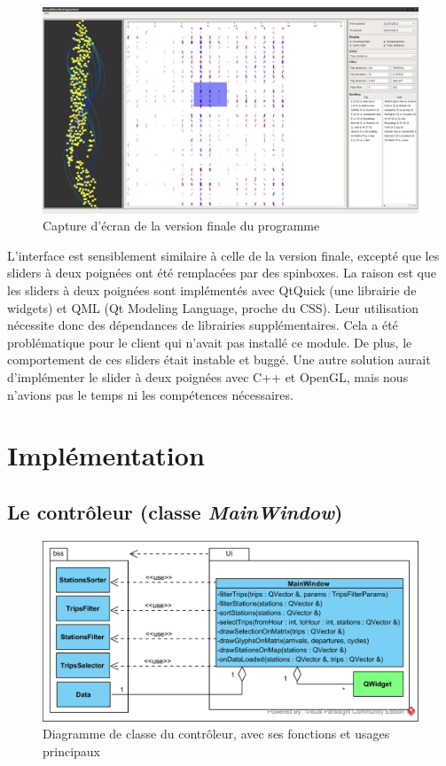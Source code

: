 \documentclass[12pt]{article}
\begin{document}
		\begin{figure}[!h]
		\begin{center}
		\includegraphics[scale=.25]{screen_final_2.png}
		\caption{Capture d’écran de la version finale du programme}
		\end{center}
		\end{figure}
		
		L’interface est sensiblement similaire à celle de la version finale, excepté que les sliders à deux poignées ont été remplacées par des spinboxes. La raison est que les sliders à deux poignées sont implémentés avec QtQuick (une librairie de widgets) et QML (Qt Modeling Language, proche du CSS). Leur utilisation nécessite donc des dépendances de librairies supplémentaires. Cela a été problématique pour le client qui n’avait pas installé ce module. De plus, le comportement de ces sliders était instable et buggé. Une autre solution aurait d'implémenter le slider à deux poignées avec C++ et OpenGL, mais nous n’avions pas le temps ni les compétences nécessaires.
		

	\section{Implémentation}
		\subsection{Le contrôleur (classe \textit{MainWindow})}
		\begin{figure}[!h]
		\begin{center}
		\includegraphics[scale=1]{class_diagram_controleur.png}
		\caption{Diagramme de classe du contrôleur, avec ses fonctions et usages principaux}
		\label{fig:dia_controleur}
		\end{center}
		\end{figure}
					
\end{document}
